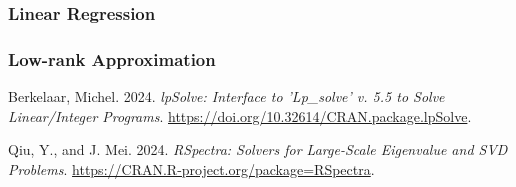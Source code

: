 \documentclass[
  12pt,
  letterpaper,
  DIV=11,
  numbers=noendperiod]{scrartcl}
\newlength{\cslhangindent}
\newenvironment{CSLReferences}[2] %
 {\begin{list}{}{%
  \setlength{\itemindent}{0pt}
  \setlength{\leftmargin}{0pt}
  \setlength{\parsep}{0pt}
  \ifodd #1
   \setlength{\leftmargin}{\cslhangindent}
   \setlength{\itemindent}{-1\cslhangindent}
  \fi
  \setlength{\itemsep}{#2\baselineskip}}}
 {\end{list}}
\theoremstyle{plain}
\theoremstyle{remark}
\begin{document}
\subsubsection{Linear Regression}\label{linear-regression}

\subsubsection*{Low-rank Approximation}\label{low-rank-approximation}

\label{refs}
\begin{CSLReferences}{1}{0}
Berkelaar, Michel. 2024. \emph{lpSolve: Interface to 'Lp\_solve' v. 5.5
to Solve Linear/Integer Programs}.
\url{https://doi.org/10.32614/CRAN.package.lpSolve}.

Qiu, Y., and J. Mei. 2024. \emph{{RSpectra: Solvers for Large-Scale
Eigenvalue and SVD Problems}}.
\url{https://CRAN.R-project.org/package=RSpectra}.

\end{CSLReferences}
\end{document}
